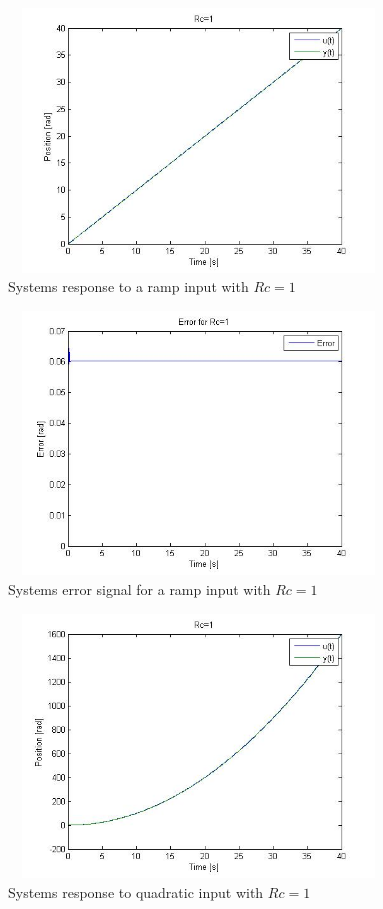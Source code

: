 \documentclass[letterpaper, 11pt, openany]{book}
\begin{document}
\begin{enumerate}
\begin{enumerate}
\begin{figure}[htbp]%
\centering
\includegraphics[width=0.9\textwidth, height = 7cm]{graphics/Ramp1.jpg} 
\caption{Systems response to a ramp input with $Rc = 1$}\label{fig:Ramp1}
\end{figure}

\begin{figure}[htbp]%
\centering
\includegraphics[width=0.9\textwidth, height = 7cm]{graphics/Ramp1Err.jpg} 
\caption{Systems error signal for a ramp input with $Rc = 1$}\label{fig:Ramp1Err}
\end{figure}

\begin{figure}[htbp]%
\centering
\includegraphics[width=0.9\textwidth, height = 7cm]{graphics/Quad1.jpg} 
\caption{Systems response to quadratic input with $Rc = 1$}\label{fig:Quad1}
\end{figure}


\end{enumerate}
\end{enumerate}
\end{document}
